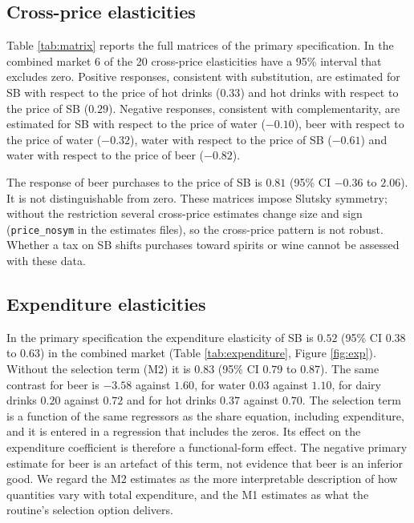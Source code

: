 \documentclass[
  11pt,
]{article}
\begin{document}
\subsection{Cross-price elasticities}\label{cross-price-elasticities}

Table \ref{tab:matrix} reports the full matrices of the primary
specification. In the combined market 6 of the 20 cross-price
elasticities have a 95\% interval that excludes zero. Positive
responses, consistent with substitution, are estimated for SB with
respect to the price of hot drinks (\(0.33\)) and hot drinks with
respect to the price of SB (\(0.29\)). Negative responses, consistent
with complementarity, are estimated for SB with respect to the price of
water (\(-0.10\)), beer with respect to the price of water (\(-0.32\)),
water with respect to the price of SB (\(-0.61\)) and water with respect
to the price of beer (\(-0.82\)).

The response of beer purchases to the price of SB is \(0.81\) (95\% CI
\(-0.36\) to \(2.06\)). It is not distinguishable from zero. These
matrices impose Slutsky symmetry; without the restriction several
cross-price estimates change size and sign (\texttt{price\_nosym} in the
estimates files), so the cross-price pattern is not robust. Whether a
tax on SB shifts purchases toward spirits or wine cannot be assessed
with these data.

\subsection{Expenditure elasticities}\label{expenditure-elasticities}

In the primary specification the expenditure elasticity of SB is
\(0.52\) (95\% CI \(0.38\) to \(0.63\)) in the combined market (Table
\ref{tab:expenditure}, Figure \ref{fig:exp}). Without the selection term
(M2) it is \(0.83\) (95\% CI \(0.79\) to \(0.87\)). The same contrast
for beer is \(-3.58\) against \(1.60\), for water \(0.03\) against
\(1.10\), for dairy drinks \(0.20\) against \(0.72\) and for hot drinks
\(0.37\) against \(0.70\). The selection term is a function of the same
regressors as the share equation, including expenditure, and it is
entered in a regression that includes the zeros. Its effect on the
expenditure coefficient is therefore a functional-form effect. The
negative primary estimate for beer is an artefact of this term, not
evidence that beer is an inferior good. We regard the M2 estimates as
the more interpretable description of how quantities vary with total
expenditure, and the M1 estimates as what the routine's selection option
delivers.
\end{document}
